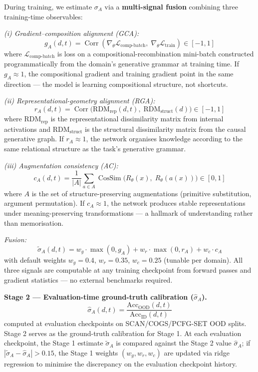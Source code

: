 \documentclass[11pt]{article}
\theoremstyle{definition}
\theoremstyle{plain}
\DeclareMathOperator{\Corr}{Corr}
\DeclareMathOperator{\CosSim}{CosSim}
\begin{document}
During training, we estimate $\sigma_A$ via a \textbf{multi-signal fusion}
combining three training-time observables:

\textit{(i) Gradient--composition alignment (GCA):}
\begin{equation}\label{eq:gca}
g_A(d,t) = \Corr\!\left(\nabla_{\theta}\mathcal{L}_{\text{comp-batch}},\;\nabla_{\theta}\mathcal{L}_{\text{train}}\right) \in [-1,1]
\end{equation}
where $\mathcal{L}_{\text{comp-batch}}$ is loss on a compositional-recombination
mini-batch constructed programmatically from the domain's generative grammar
at training time.
If $g_A \approx 1$, the compositional gradient and training gradient point
in the same direction --- the model is learning compositional structure,
not shortcuts.

\textit{(ii) Representational-geometry alignment (RGA):}
\begin{equation}\label{eq:rga}
r_A(d,t) = \Corr\!\Big(\text{RDM}_{\text{rep}}(d,t),\;\text{RDM}_{\text{struct}}(d)\Big) \in [-1,1]
\end{equation}
where $\text{RDM}_{\text{rep}}$ is the representational dissimilarity matrix
from internal activations and $\text{RDM}_{\text{struct}}$ is the structural
dissimilarity matrix from the causal generative graph.
If $r_A \approx 1$, the network organises knowledge according to the
same relational structure as the task's generative grammar.

\textit{(iii) Augmentation consistency (AC):}
\begin{equation}\label{eq:ac}
c_A(d,t) = \frac{1}{|A|}\sum_{a \in A} \CosSim\!\Big(R_{\theta}(x),\;R_{\theta}(a(x))\Big) \in [0,1]
\end{equation}
where $A$ is the set of structure-preserving augmentations (primitive
substitution, argument permutation).
If $c_A \approx 1$, the network produces stable representations under
meaning-preserving transformations --- a hallmark of understanding
rather than memorisation.

\textit{Fusion:}
\begin{equation}\label{eq:fusion}
\tilde{\sigma}_A(d,t) = w_g \cdot \max(0, g_A) + w_r \cdot \max(0, r_A) + w_c \cdot c_A
\end{equation}
with default weights $w_g = 0.4$, $w_r = 0.35$, $w_c = 0.25$ (tunable per
domain). All three signals are computable at any training checkpoint from
forward passes and gradient statistics --- no external benchmarks required.

\textbf{Stage 2 --- Evaluation-time ground-truth calibration ($\hat{\sigma}_A$).}
\begin{equation}
\hat{\sigma}_A(d,t) = \frac{\text{Acc}_{\text{OOD}}(d,t)}{\text{Acc}_{\text{ID}}(d,t)}
\label{eq:sgg-proxy}
\end{equation}
computed at evaluation checkpoints on SCAN/COGS/PCFG-SET OOD splits.
Stage 2 serves as the ground-truth calibration for Stage 1. At each
evaluation checkpoint, the Stage 1 estimate $\tilde{\sigma}_A$ is compared
against the Stage 2 value $\hat{\sigma}_A$; if
$|\tilde{\sigma}_A - \hat{\sigma}_A| > 0.15$, the Stage 1 weights
$(w_g, w_r, w_c)$ are updated via ridge regression to minimise the
discrepancy on the evaluation checkpoint history.
\end{document}
